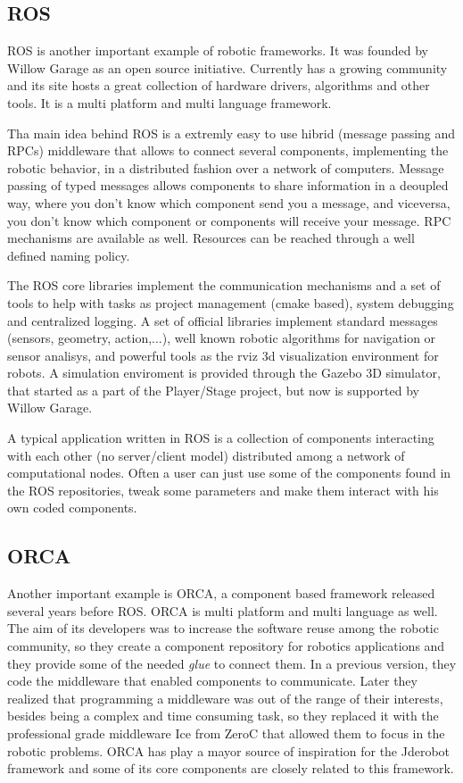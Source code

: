 \documentclass[twocolumn]{svjour3}          %
\begin{document}
\subsection{ROS}
ROS is another important example of robotic frameworks. It was founded by Willow Garage as an open source initiative. Currently has a growing community
and its site hosts a great collection of hardware drivers, algorithms
and other tools. It is a multi platform and multi language framework.

Tha main idea behind ROS is a extremly easy to use hibrid (message passing and RPCs) middleware that allows to connect several components, implementing the robotic behavior, in a distributed fashion over a network of computers. Message passing of typed messages allows components to share information in a deoupled way, where you don't know which component send you a message, and viceversa, you don't know which component or components will receive your message. RPC mechanisms are available as well. Resources can be reached through a well defined naming policy.

The ROS core libraries implement the communication mechanisms and a set of tools to help with tasks as project management (cmake based), system
debugging and centralized logging. A set of official libraries implement standard messages (sensors, geometry, action,...), well known robotic algorithms for navigation or sensor analisys, and powerful tools as the rviz 3d visualization environment for robots. A simulation enviroment is provided through the Gazebo 3D simulator, that started as a part of the Player/Stage project, but now is supported by Willow Garage.

A typical application written in ROS is a collection of components interacting with each other (no server/client model) distributed among a network of computational nodes. Often a user can just use some of the components found in the ROS repositories, tweak some parameters and make them interact with his own coded components.

\subsection{ORCA}
Another important example is ORCA, a component based framework released several years before ROS. ORCA is multi platform and multi language as well. The aim of its developers was to increase the software reuse among the robotic community, so they create a component repository for robotics applications and they provide some of the needed \textit{glue} to connect them. In a previous version, they code the middleware that enabled components to communicate. Later they realized that programming a middleware was out of the range of their interests, besides being a complex and time consuming task, so they replaced it with the professional grade middleware Ice from ZeroC \cite{henning04} that allowed them to focus in the robotic problems. ORCA has play a mayor source of inspiration for the Jderobot framework and some of its core components are closely related to this framework.
\end{document}
